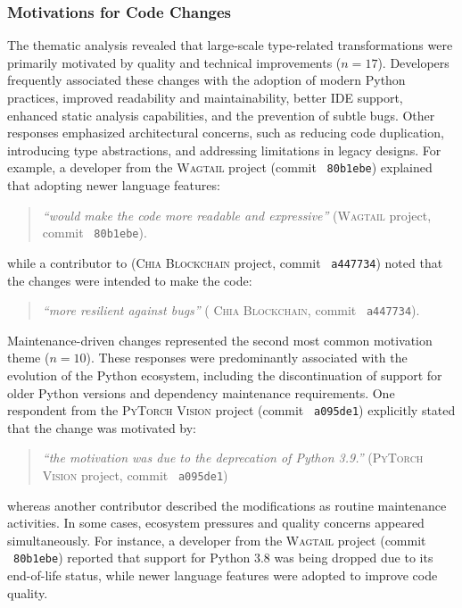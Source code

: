 \subsubsection{Motivations for Code Changes}
The thematic analysis revealed that large-scale type-related transformations were primarily motivated by quality and technical improvements ($n = 17$). Developers frequently associated these changes with the adoption of modern Python practices, improved readability and maintainability, better IDE support, enhanced static analysis capabilities, and the prevention of subtle bugs. Other responses emphasized architectural concerns, such as reducing code duplication, introducing type abstractions, and addressing limitations in legacy designs. For example, a developer from the \textsc{Wagtail} project (commit ~\texttt{80b1ebe}) explained that adopting newer language features:

\begin{quote}
\textit{``would make the code more readable and expressive''} (\textsc{Wagtail} project, commit ~\texttt{80b1ebe}).
\end{quote}

while a contributor to (\textsc{Chia Blockchain} project, commit ~\texttt{a447734}) noted that the changes were intended to make the code:

\begin{quote}
\textit{``more resilient against bugs''} ( \textsc{Chia Blockchain}, commit ~\texttt{a447734}).
\end{quote}
Maintenance-driven changes represented the second most common motivation theme ($n = 10$). These responses were predominantly associated with the evolution of the Python ecosystem, including the discontinuation of support for older Python versions and dependency maintenance requirements. One respondent from the \textsc{PyTorch Vision} project (commit ~\texttt{a095de1}) explicitly stated that the change was motivated by:

\begin{quote}
\textit{``the motivation was due to the deprecation of Python 3.9.''} (\textsc{PyTorch Vision} project, commit ~\texttt{a095de1})
\end{quote}

whereas another contributor described the modifications as routine maintenance activities. In some cases, ecosystem pressures and quality concerns appeared simultaneously. For instance, a developer from the \textsc{Wagtail} project (commit ~\texttt{80b1ebe}) reported that support for Python 3.8 was being dropped due to its end-of-life status, while newer language features were adopted to improve code quality.

